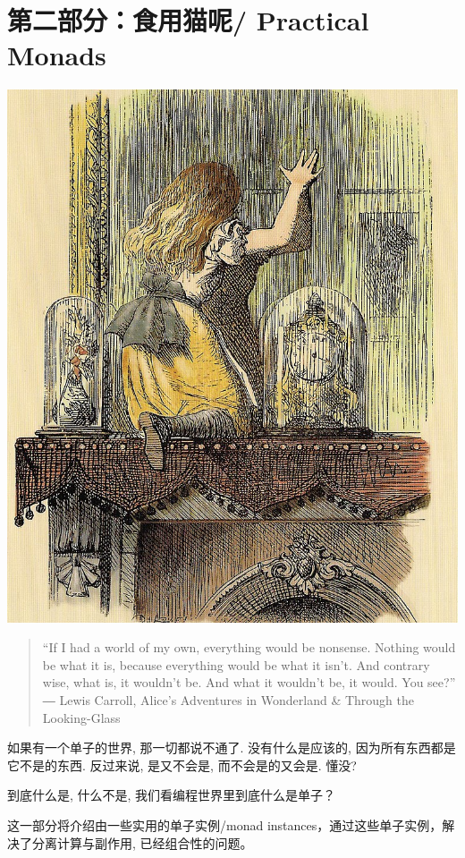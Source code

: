 \documentclass[11pt]{tufte-book}
\begin{document}
\part{第二部分：食用猫呢/ Practical Monads}
\label{sec:org79df89b}

\begin{center}
\includegraphics[width=.9\linewidth]{./images/Alice_through_the_looking_glass.jpg}
\end{center}

\begin{quote}
“If I had a world of my own, everything would be nonsense. 
Nothing would be what it is, because everything would be what it isn't.
And contrary wise, what is, it wouldn't be. And what it wouldn't be, it would. You see?”
― Lewis Carroll, Alice's Adventures in Wonderland \& Through the Looking-Glass 
\end{quote}

如果有一个单子的世界, 那一切都说不通了.
没有什么是应该的, 因为所有东西都是它不是的东西.
反过来说, 是又不会是, 而不会是的又会是. 懂没?

到底什么是, 什么不是, 我们看编程世界里到底什么是单子？

这一部分将介绍由一些实用的单子实例/monad instances，通过这些单子实例，解决了分离计算与副作用, 已经组合性的问题。
\end{document}
